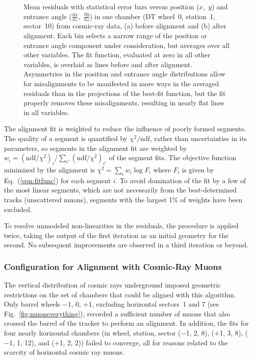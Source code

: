 \begin{figure}
\caption{Mean residuals with statistical error bars versus position ($x$,~$y$)
and entrance angle ($\frac{\textrm{d}x}{\textrm{d}z}$,~$\frac{\textrm{d}y}{\textrm{d}z}$) in one chamber
(DT wheel~0, station~1, sector~10) from cosmic-ray data, (a) before
alignment and (b) after alignment.  Each bin selects a narrow range of
the position or entrance angle component under consideration, but
averages over all other variables.  The fit function, evaluated at
zero in all other variables, is overlaid as lines before and after
alignment.  Asymmetries in the position and entrance angle
distributions allow for misalignments to be manifested in more ways in
the averaged residuals than in the projections of the best-fit function, but the fit properly
removes these misalignments, resulting in nearly flat lines in all variables.
\label{fig:examplefit}}
\end{figure}

The alignment fit is weighted to reduce the influence of poorly formed
segments.  The quality of a segment is quantified by
$\chi^2/\mbox{ndf}$, rather than uncertainties in its parameters, so
segments in the alignment fit are weighted by $w_i =
(\mbox{ndf}/\chi^2)_i/\sum_{i'} (\mbox{ndf}/\chi^2)_{i'}$ of the
segment fits.  The objective function minimized by the alignment is
$\chi^2 = \sum_i w_i \log F_i$ where $F_i$ is given by
Eq.~(\ref{eqn:fitfunc}) for each segment $i$.  To avoid domination of
the fit by a few of the most linear segments, which are not
necessarily from the best-determined tracks (unscattered muons), segments with the largest 1\% of
weights have been excluded.

To resolve unmodeled non-linearities in the residuals, the procedure
is applied twice, taking the output of the first iteration as an
initial geometry for the second.  No subsequent improvements are
observed in a third iteration or beyond.

\subsubsection{Configuration for Alignment with Cosmic-Ray Muons}
\label{sec:configuration}

The vertical distribution of cosmic rays underground imposed geometric
restrictions on the set of chambers that could be aligned with this
algorithm.  Only barrel wheels $-$1, 0, $+$1, excluding horizontal
sectors~1 and 7 (see Fig.~\ref{fig:muoneverything}), recorded a
sufficient number of muons that also crossed the barrel of the tracker
to perform an alignment.  In addition, the fits for four nearly
horizontal chambers (in wheel, station, sector ($-$1, 2, 8), ($+$1, 3,
8), ($-$1, 1, 12), and ($+$1, 2, 2)) failed to converge, all for
reasons related to the scarcity of horizontal cosmic ray muons.


